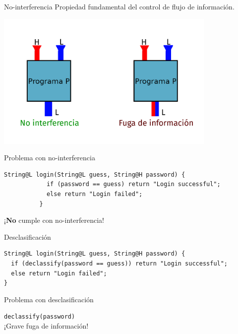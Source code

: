 \documentclass[aspectratio=169,18pt]{beamer}
\begin{document}
\begin{frame}[fragile]{No-interferencia}
  Propiedad fundamental del control de flujo de información.
	\begin{center}
		\includegraphics[width=0.8\textwidth]{images/noninterference.png}
	\end{center}
\end{frame}

\begin{frame}[fragile]{Problema con no-interferencia}
	\begin{center}
\begin{lstlisting}[basicstyle=\fontsize{10}{10}\ttfamily]
          String@L login(String@L guess, String@H password) {
            if (password == guess) return "Login successful";
            else return "Login failed";
          }
\end{lstlisting} \pause
		\vspace{3cm}
		\alert{¡\textbf{No} cumple con no-interferencia!}
	\end{center}
\end{frame}

\begin{frame}[fragile]{Desclasificación}
	\begin{center}
\begin{lstlisting}[basicstyle=\fontsize{10}{10}\ttfamily]
String@L login(String@L guess, String@H password) {
  if (declassify(password == guess)) return "Login successful";
  else return "Login failed";
}
\end{lstlisting}
	\end{center}
\end{frame}

\begin{frame}[fragile]{Problema con desclasificación}
	\begin{center}
		\texttt{declassify(password)} \\ \pause
		\vspace{3cm}
		\alert{¡Grave fuga de información!}
	\end{center}
\end{frame}
\end{document}

